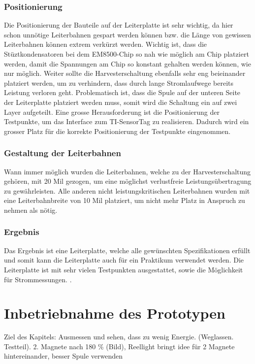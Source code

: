 \subsubsection{Positionierung}
Die Positionierung der Bauteile auf der Leiterplatte ist sehr wichtig, da hier schon unnötige Leiterbahnen gespart werden können bzw. die Länge von gewissen Leiterbahnen können extrem verkürzt werden.
Wichtig ist, dass die Stüztkondensatoren bei dem EM8500-Chip so nah wie möglich am Chip platziert werden, damit die Spannungen am Chip so konstant gehalten werden können, wie nur möglich.
Weiter sollte die Harvesterschaltung ebenfalls sehr eng beieinander platziert werden, um zu verhindern, dass durch lange Stromlaufwege bereits Leistung verloren geht. Problematisch ist, dass die Spule auf der unteren Seite der Leiterplatte platziert werden muss, somit wird die Schaltung ein auf zwei Layer aufgeteilt.
Eine grosse Herausforderung ist die Positionierung der Testpunkte, um das Interface zum TI-SensorTag zu realisieren. Dadurch wird ein grosser Platz für die korrekte Positionierung der Testpunkte eingenommen.

\subsubsection{Gestaltung der Leiterbahnen}

Wann immer möglich wurden die Leiterbahnen, welche zu der Harvesterschaltung gehören, mit 20 Mil gezogen, um eine möglichst verlustfreie Leistungsübertragung zu gewährleisten. Alle anderen nicht leistungskritischen Leiterbahnen wurden mit eine Leiterbahnbreite von 10 Mil platziert, um nicht mehr Platz in Anspruch zu nehmen als nötig.

\subsubsection{Ergebnis}

Das Ergebnis ist eine Leiterplatte, welche alle gewünschten Spezifikationen erfüllt und somit kann die Leiterplatte auch für ein Praktikum verwendet werden. Die Leiterplatte ist mit sehr vielen Testpunkten ausgestattet, sowie die Möglichkeit für Strommessungen.
.

\section{Inbetriebnahme des Prototypen}
Ziel des Kapitels: Ausmessen und sehen, dass zu wenig Energie. (Weglassen. Testteil). 2. Magnete nach 180 \% (Bild), Reellight bringt idee für 2 Magnete hintereinander, besser Spule verwenden

